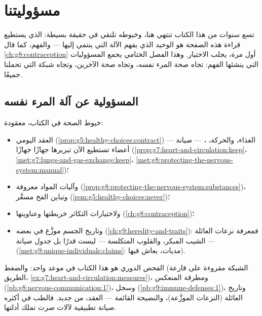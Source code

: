 \chapter{مسؤوليتنا}\label{ch:g9:our-responsibility}

تسع سنوات من هذا الكتاب تنتهي هنا، وخيوطه تلتقي في حقيقة
بسيطة:  الذي يستطيع قراءة هذه الصفحة هو 
الوحيد الذي يفهم الآلة التي ينتمي إليها --- والفهم، كما
قال \cref{ch:g8:contraception} أول مرة، يجلب الاختيار.
وهذا الفصل الختامي يجمع المسؤوليات التي ينشئها الفهم:
تجاه صحة المرء نفسه، وتجاه صحة الآخرين، وتجاه شبكة
 التي تحملنا جميعًا.

\section{المسؤولية عن آلة المرء نفسه}

\begin{proposition}\label{prop:g9:our-responsibility:self}
خيوط الصحة في الكتاب، معقودة:
\begin{itemize}
  \item العقد اليومي
        (\cref{prop:g5:healthy-choices:contract}) ---
        الغذاء، والحركة، ،  --- صيانة
        أعضاء تستطيع الآن تبريرها جهازًا جهازًا
        (\cref{prop:g7:heart-and-circulation:keep}،
        \cref{met:g7:lungs-and-gas-exchange:keep}،
        \cref{met:g8:protecting-the-nervous-system:manual})؛
  \item وآليات المواد معروفة
        (\cref{prop:g8:protecting-the-nervous-system:substances})،
        وتباين الفخ مسعَّر
        (\cref{rem:g5:healthy-choices:never})؛
  \item ولاختيارات التكاثر خريطتها وعناوينها
        (\cref{ch:g8:contraception})؛
  \item وتاريخ الجسم موزَّع في بعضه
        (\cref{ch:g9:heredity-and-traits}): فمعرفة نزعات
        العائلة --- الشيب المبكر، والقلوب المتكلسة ---
        ليست قدرًا بل جدول صيانة
        (\cref{met:g9:unique-individuals:claims}: مديات،
        يعاش فيها).
\end{itemize}
\end{proposition}
\admitted

\begin{example}\label{ex:g9:our-responsibility:checkup}
الفحص الدوري هو هذا الكتاب في موعد واحد:  والضغط
(الشبكة مقروءة على قارعة الطريق،
\cref{ex:g7:heart-and-circulation:measures})، ومطرقة
المنعكس (\cref{pb:g8:nervous-communication:1})، وسجل
 (\cref{pb:g9:immune-defenses:1})، وتاريخ العائلة
(النزعات الموزَّعة)، والنصيحة القائمة --- العقد، من
جديد. فالطب في أكثره صيانة تطبيقية لآلات صرت تملك
أدلتها.
\end{example}

